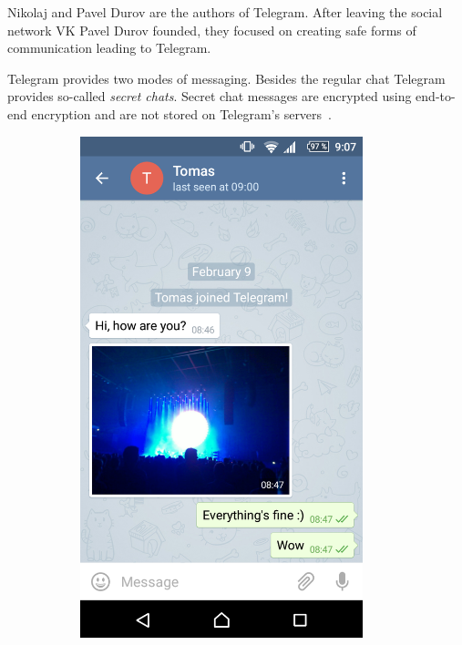 \documentclass[thesis=M,english]{FITthesis}[2012/10/20]
\begin{document}
Nikolaj and Pavel Durov are the authors of Telegram. After leaving the  social network VK Pavel Durov founded, they focused on creating safe forms of communication leading to Telegram.

Telegram provides two modes of messaging. Besides the regular chat Telegram provides so-called \emph{secret chats}. Secret chat messages are encrypted using end-to-end encryption and are not stored on Telegram's servers~\cite{telegramfaq}.

\begin{figure}[htb]
	\centering
	\label{A}
	\begin{subfigure}[b]{0.4\textwidth}
		\centering
		\includegraphics[width=0.9\textwidth]{telegram-regular.png}

\end{subfigure}
\end{figure}
\end{document}
